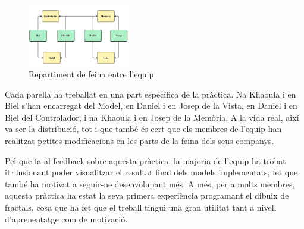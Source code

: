 \documentclass{ieeetj}
\begin{document}
\begin{figure}[htbp]
\centerline{\includegraphics[width=0.4\textwidth]{docs/png/Repartiment.jpg}}
\caption{Repartiment de feina entre l'equip}
\label{fig:int2}
\end{figure}

Cada parella ha treballat en una part específica de la pràctica. Na Khaoula i en Biel s'han encarregat del Model, en Daniel i en Josep de la Vista, en Daniel i en Biel del Controlador, i na Khaoula i en Josep de la Memòria. A la vida real, així va ser la distribució, tot i que també és cert que els membres de l'equip han realitzat petites modificacions en les parts de la feina dels seus companys.

Pel que fa al feedback sobre aquesta pràctica, la majoria de l’equip ha trobat il·lusionant poder visualitzar el resultat final dels models implementats, fet que també ha motivat a seguir-ne desenvolupant més. A més, per a molts membres, aquesta pràctica ha estat la seva primera experiència programant el dibuix de fractals, cosa que ha fet que el treball tingui una gran utilitat tant a nivell d’aprenentatge com de motivació.
\end{document}
